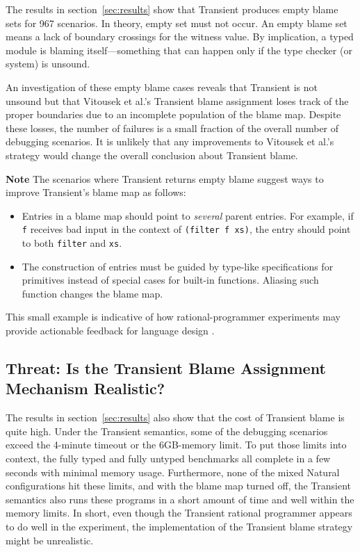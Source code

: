 The results in section~\ref{sec:results} show that Transient produces empty
blame sets for 967 scenarios. In theory, empty set must not occur. An
empty blame set means a lack of boundary crossings for the witness value.
By implication, a typed module is blaming itself---something that can
happen only if the type checker (or system) is unsound.

An investigation of these empty blame cases reveals that Transient is not
unsound but that Vitousek et al.'s Transient blame assignment loses track
of the proper boundaries due to an incomplete population of the blame map.
Despite these losses, the number of failures is a small fraction of the
overall number of debugging scenarios. It is unlikely that any
improvements to Vitousek et al.'s strategy would change the overall
conclusion about Transient blame.

{\bf Note} The scenarios where Transient returns empty blame 
suggest ways to improve Transient's blame map as follows:
\begin{itemize}

\item Entries in a blame map should point to {\em several\/} parent entries.
 For example, if \texttt{f} receives bad input in the context of {\tt (filter f
 xs)}, the entry should point to both \texttt{filter} and \texttt{xs}.

\item The construction of entries must be guided by type-like specifications for
 primitives instead of special cases for built-in functions. Aliasing such
 function changes the blame map.

\end{itemize}
This small example is indicative of how rational-programmer experiments may
provide actionable feedback for language design . 


\subsection{Threat: Is the Transient Blame Assignment Mechanism Realistic?}
\label{sec:threat:transient2}

The results in section~\ref{sec:results} also show that the cost of Transient
blame is quite high. Under the Transient semantics, some of the debugging
scenarios exceed the 4-minute timeout or the 6GB-memory limit. To put those
limits into context, the fully typed and fully untyped benchmarks all complete
in a few seconds with minimal memory usage. Furthermore, none of the mixed
Natural configurations hit these limits, and with the blame map turned off,
the Transient semantics also runs these programs in a short amount of time and
well within the memory limits. In short, even though the Transient rational
programmer appears to do well in the experiment, the implementation of the
Transient blame strategy might be unrealistic. 

